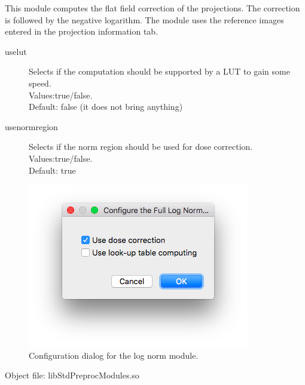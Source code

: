 \documentclass[a4paper]{scrreprt}
\begin{document}
This module computes the flat field correction of the projections. The correction is followed by the negative logarithm. The module uses the reference images entered in the projection information tab.
\begin{description}
 \item[uselut] Selects if the computation should be supported by a LUT to gain some speed. \\Values:true/false.\\Default: false (it does not bring anything)
\item[usenormregion] Selects if the norm region should be used for dose correction. \\Values:true/false.\\Default: true
\end{description}
\begin{figure}[ht!]
\centering
\includegraphics[scale=0.5]{figures3/Module_LogNorm.png}
\caption{Configuration dialog for the log norm module.}
\end{figure}
Object file: libStdPreprocModules.so
\end{document}
